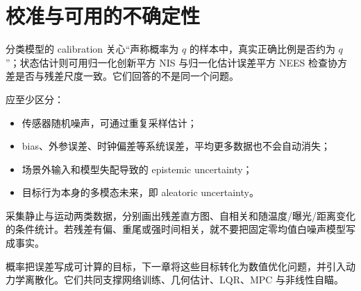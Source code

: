 \section{校准与可用的不确定性}

分类模型的 calibration 关心“声称概率为 $q$ 的样本中，真实正确比例是否约为 $q$”；状态估计则可用归一化创新平方 NIS 与归一化估计误差平方 NEES 检查协方差是否与残差尺度一致。它们回答的不是同一个问题。

应至少区分：
\begin{itemize}
  \item 传感器随机噪声，可通过重复采样估计；
  \item bias、外参误差、时钟偏差等系统误差，平均更多数据也不会自动消失；
  \item 场景外输入和模型失配导致的 epistemic uncertainty；
  \item 目标行为本身的多模态未来，即 aleatoric uncertainty。
\end{itemize}

\begin{engineeringcheck}
采集静止与运动两类数据，分别画出残差直方图、自相关和随温度/曝光/距离变化的条件统计。若残差有偏、重尾或强时间相关，就不要把固定零均值白噪声模型写成事实。
\end{engineeringcheck}

\begin{chaptertransition}
概率把误差写成可计算的目标，下一章将这些目标转化为数值优化问题，并引入动力学离散化。它们共同支撑网络训练、几何估计、LQR、MPC 与非线性自瞄。
\end{chaptertransition}


